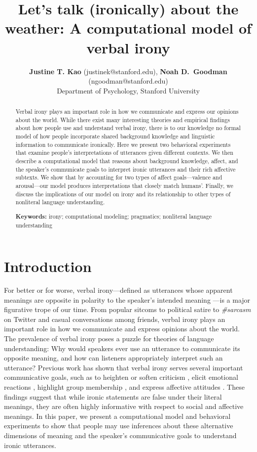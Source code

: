\documentclass[10pt,letterpaper]{article}
\title{Let's talk (ironically) about the weather: A computational model of verbal irony}
\author{{\large {\bf Justine T. Kao} (justinek@stanford.edu)}, {\large {\bf Noah D.~Goodman} (ngoodman@stanford.edu)}\\
  Department of Psychology, Stanford University}
\begin{document}
\maketitle


\begin{abstract}
Verbal irony plays an important role in how we communicate and express our opinions about the world. While there exist many interesting theories and empirical findings about how people use and understand verbal irony, there is to our knowledge no formal model of how people incorporate shared background knowledge and linguistic information to communicate ironically. Here we present two behavioral experiments that examine people's interpretations of utterances given different contexts. We then describe a computational model that reasons about background knowledge, affect, and the speaker's communicate goals to interpret ironic utterances and their rich affective subtexts. We show that by accounting for two types of affect goals---valence and arousal---our model produces interpretations that closely match humans'. Finally, we discuss the implications of our model on irony and its relationship to other types of nonliteral language understanding.


\textbf{Keywords:} 
irony; computational modeling; pragmatics; nonliteral language understanding
\end{abstract}


\section{Introduction}
For better or for worse, verbal irony---defined as utterances whose apparent meanings are opposite in polarity to the speaker's intended meaning \cite{roberts1994people, colston2000contrast}---is a major figurative trope of our time. From popular sitcoms to political satire to \emph{\#sarcasm} on Twitter and casual conversations among friends, verbal irony plays an important role in how we communicate and express  opinions about the world. The prevalence of verbal irony poses a puzzle for theories of language understanding: Why would speakers ever use an utterance to communicate its opposite meaning, and how can listeners appropriately interpret such an utterance? Previous work has shown that verbal irony serves several important communicative goals, such as to heighten or soften criticism \cite{colston1997salting}, elicit emotional reactions \cite{leggitt2000emotional}, highlight group membership \cite{gibbs2000irony}, and express affective attitudes \cite{colston1998you, colston1997ve}. These findings suggest that while ironic statements are false under their literal meanings, they are often highly informative with respect to social and affective meanings. 
In this paper, we present a computational model and behavioral experiments to show that people may use inferences about these alternative dimensions of meaning and the speaker's communicative goals to understand ironic utterances.  
\end{document}
